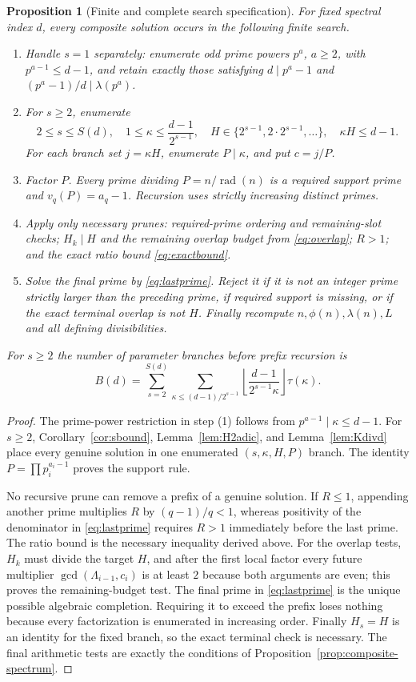 \documentclass[11pt]{article}
\newtheorem{proposition}[theorem]{Proposition}
\newcommand{\rad}{\operatorname{rad}}
\begin{document}
\begin{proposition}[Finite and complete search specification]
\label{prop:search-spec}
For fixed spectral index $d$, every composite solution occurs in the following
finite search.
\begin{enumerate}[label=(\arabic*)]
\item Handle $s=1$ separately: enumerate odd prime powers $p^a$, $a\ge2$,
with $p^{a-1}\le d-1$, and retain exactly those satisfying
$d\mid p^a-1$ and $(p^a-1)/d\mid\lambda(p^a)$.
\item For $s\ge2$, enumerate
\[
2\le s\le S(d),\quad
1\le\kappa\le\frac{d-1}{2^{s-1}},\quad
H\in\{2^{s-1},2\cdot2^{s-1},\ldots\},\quad
\kappa H\le d-1.
\]
For each branch set $j=\kappa H$, enumerate $P\mid\kappa$, and put $c=j/P$.
\item Factor $P$.  Every prime dividing $P=n/\rad(n)$ is a required support
prime and $v_q(P)=a_q-1$.  Recursion uses strictly increasing distinct primes.
\item Apply only necessary prunes: required-prime ordering and remaining-slot
checks; $H_k\mid H$ and the remaining overlap budget from
\eqref{eq:overlap}; $R>1$; and the exact ratio bound
\eqref{eq:exactbound}.
\item Solve the final prime by \eqref{eq:lastprime}.  Reject it if it is not
an integer prime strictly larger than the preceding prime, if required support
is missing, or if the exact terminal overlap is not $H$.  Finally recompute
$n,\phi(n),\lambda(n),L$ and all defining divisibilities.
\end{enumerate}
For $s\ge2$ the number of parameter branches before prefix recursion is
\[
B(d)=\sum_{s=2}^{S(d)}
\sum_{\kappa\le(d-1)/2^{s-1}}
\left\lfloor\frac{d-1}{2^{s-1}\kappa}\right\rfloor\tau(\kappa).
\]
\end{proposition}

\begin{proof}
The prime-power restriction in step (1) follows from
$p^{a-1}\mid\kappa\le d-1$.  For $s\ge2$, Corollary~\ref{cor:sbound},
Lemma~\ref{lem:H2adic}, and Lemma~\ref{lem:Kdivd} place every genuine
solution in one enumerated $(s,\kappa,H,P)$ branch.  The identity
$P=\prod p_i^{a_i-1}$ proves the support rule.

No recursive prune can remove a prefix of a genuine solution.  If $R\le1$,
appending another prime multiplies $R$ by $(q-1)/q<1$, whereas positivity of
the denominator in \eqref{eq:lastprime} requires $R>1$ immediately before
the last prime.  The ratio bound is the necessary inequality derived above.
For the overlap tests, $H_k$ must divide the target $H$, and after the first
local factor every future multiplier
$\gcd(\Lambda_{i-1},c_i)$ is at least $2$ because both arguments are even;
this proves the remaining-budget test.  The final prime in
\eqref{eq:lastprime} is the unique possible algebraic completion.  Requiring
it to exceed the prefix loses nothing because every factorization is enumerated
in increasing order.  Finally $H_s=H$ is an identity for the fixed branch, so
the exact terminal check is necessary.  The final arithmetic tests are exactly
the conditions of Proposition~\ref{prop:composite-spectrum}.
\end{proof}
\end{document}
